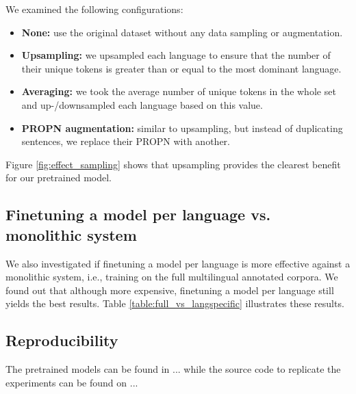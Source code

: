 \documentclass[11pt]{article}
\begin{document}
We examined the following configurations:
\begin{itemize}
  \item \textbf{None:} use the original dataset without any data sampling or augmentation.
  \item \textbf{Upsampling:} we upsampled each language to ensure that the number of their unique tokens is greater than or equal to the most dominant language.
  \item \textbf{Averaging:} we took the average number of unique tokens in the whole set and up-/downsampled each language based on this value.
  \item \textbf{PROPN augmentation:} similar to upsampling, but instead of duplicating sentences, we replace their \textsc{PROPN} with another.
\end{itemize}

Figure \ref{fig:effect_sampling} shows that upsampling provides the clearest benefit for our pretrained model.


\subsection{Finetuning a model per language vs. monolithic system}

We also investigated if finetuning a model per language is more effective against a monolithic system, i.e., training on the full multilingual annotated corpora.
We found out that although more expensive, finetuning a model per language still yields the best results. 
Table \ref{table:full_vs_langspecific} illustrates these results.


\subsection{Reproducibility}

The pretrained models can be found in ... while the source code to replicate the experiments can be found on ...
\end{document}
